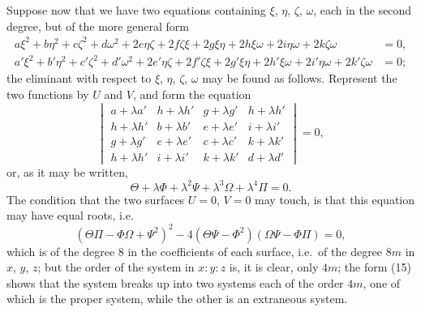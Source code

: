 \documentclass[11pt,a4paper]{book}
\begin{document}
Suppose now that we have two equations containing $\xi$, $\eta$, $\zeta$, $\omega$, each in the second degree, but of the more general form
\begin{align}
a\xi^2 + b\eta^2 + c\zeta^2 + d\omega^2 + 2e\eta\zeta + 2f\zeta\xi + 2g\xi\eta + 2h\xi\omega + 2i\eta\omega + 2k\zeta\omega &= 0, \tag{11} \\
a'\xi^2 + b'\eta^2 + c'\zeta^2 + d'\omega^2 + 2e'\eta\zeta + 2f'\zeta\xi + 2g'\xi\eta + 2h'\xi\omega + 2i'\eta\omega + 2k'\zeta\omega &= 0; \tag{12}
\end{align}
the eliminant with respect to $\xi$, $\eta$, $\zeta$, $\omega$ may be found as follows. Represent the two functions by $U$ and $V$, and form the equation
\begin{equation}
\begin{vmatrix}
a + \lambda a' & h + \lambda h' & g + \lambda g' & h + \lambda h' \\
h + \lambda h' & b + \lambda b' & e + \lambda e' & i + \lambda i' \\
g + \lambda g' & e + \lambda e' & c + \lambda c' & k + \lambda k' \\
h + \lambda h' & i + \lambda i' & k + \lambda k' & d + \lambda d'
\end{vmatrix} = 0, \tag{13}
\end{equation}
or, as it may be written,
\begin{equation}
\Theta + \lambda\Phi + \lambda^2\Psi + \lambda^3\Omega + \lambda^4\Pi = 0. \tag{14}
\end{equation}
The condition that the two surfaces $U = 0$, $V = 0$ may touch, is that this equation may have equal roots, i.e.
\begin{equation}
(\Theta\Pi - \Phi\Omega + \Psi^2)^2 - 4(\Theta\Psi - \Phi^2)(\Omega\Psi - \Phi\Pi) = 0, \tag{15}
\end{equation}
which is of the degree 8 in the coefficients of each surface, i.e.\ of the degree $8m$ in $x$, $y$, $z$; but the order of the system in $x : y : z$ is, it is clear, only $4m$; the form (15) shows that the system breaks up into two systems each of the order $4m$, one of which is the proper system, while the other is an extraneous system.
\end{document}
